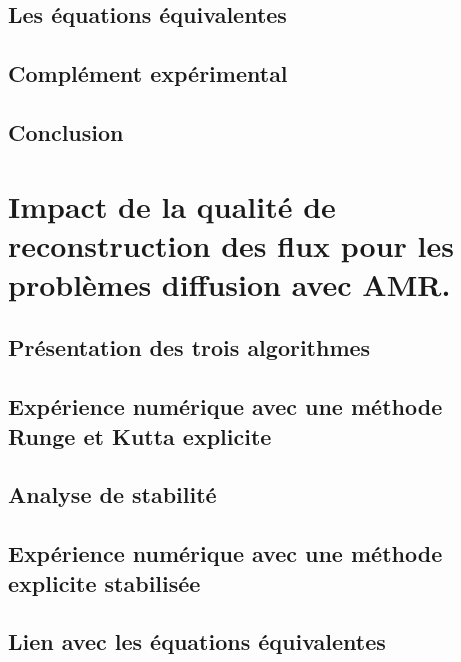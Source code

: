 \documentclass[11pt]{report}
\theoremstyle{definition}
\theoremstyle{remark}
\begin{document}
        \subsection{Les équations équivalentes}  
        \newpage
        \subsection{Complément expérimental}            
        \subsection{Conclusion}                         
    
    \newpage
    \section{Impact de la qualité de reconstruction des flux pour les problèmes diffusion avec AMR.}
        \label{par:contrib_3}
        
        \subsection{Présentation des trois algorithmes}     
        \subsection{Expérience numérique avec une méthode Runge et Kutta explicite}     
        \newpage
        \subsection{Analyse de stabilité}       
        \newpage
        \subsection{Expérience numérique avec une méthode explicite stabilisée}      
        \newpage
        \subsection{Lien avec les équations équivalentes}      
        \newpage
\end{document}
